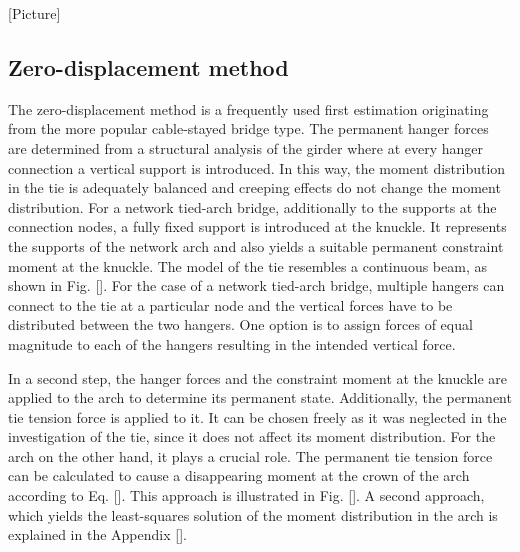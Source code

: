 [Picture]

\subsection{Zero-displacement method}
The zero-displacement method is a frequently used first estimation originating from the more popular cable-stayed bridge type. 
The permanent hanger forces are determined from a structural analysis of the girder where at every hanger connection a vertical support is introduced. In this way, the moment distribution in the tie is adequately balanced and creeping effects do not change the moment distribution. For a network tied-arch bridge, additionally to the supports at the connection nodes, a fully fixed support is introduced at the knuckle. It represents the supports of the network arch and also yields a suitable permanent constraint moment at the knuckle. The model of the tie resembles a continuous beam, as shown in Fig. []. For the case of a network tied-arch bridge, multiple hangers can connect to the tie at a particular node and the vertical forces have to be distributed between the two hangers. One option is to assign forces of equal magnitude to each of the hangers resulting in the intended vertical force. 

In a second step, the hanger forces and the constraint moment at the knuckle are applied to the arch to determine its permanent state. Additionally, the permanent tie tension force is applied to it. It can be chosen freely as it was neglected in the investigation of the tie, since it does not affect its moment distribution. For the arch on the other hand, it plays a crucial role. The permanent tie tension force can be calculated to cause a disappearing moment at the crown of the arch according to Eq. []. This approach is illustrated in Fig. []. A second approach, which yields the least-squares solution of the moment distribution in the arch is explained in the Appendix [].



